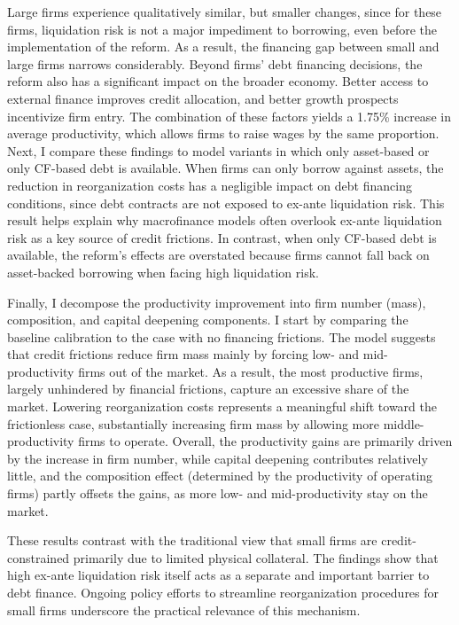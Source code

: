 \documentclass[12pt]{article}
\begin{document}
Large firms experience qualitatively similar, but smaller changes, since for these firms, liquidation risk is not a major impediment to borrowing, even before the implementation of the reform. As a result, the financing gap between small and large firms narrows considerably. Beyond firms' debt financing decisions, the reform also has a significant impact on the broader economy. Better access to external finance improves credit allocation, and better growth prospects incentivize firm entry. The combination of these factors yields a 1.75\% increase in average productivity, which allows firms to raise wages by the same proportion. Next, I compare these findings to model variants in which only asset-based or only CF-based debt is available. When firms can only borrow against assets, the reduction in reorganization costs has a negligible impact on debt financing conditions, since debt contracts are not exposed to ex-ante liquidation risk. This result helps explain why macrofinance models often overlook ex-ante liquidation risk as a key source of credit frictions. In contrast, when only CF-based debt is available, the reform's effects are overstated because firms cannot fall back on asset-backed borrowing when facing high liquidation risk.

Finally, I decompose the productivity improvement into firm number (mass), composition, and capital deepening components. I start by comparing the baseline calibration to the case with no financing frictions. The model suggests that credit frictions reduce firm mass mainly by forcing low- and mid-productivity firms out of the market. As a result, the most productive firms, largely unhindered by financial frictions, capture an excessive share of the market. Lowering reorganization costs represents a meaningful shift toward the frictionless case, substantially increasing firm mass by allowing more middle-productivity firms to operate. Overall, the productivity gains are primarily driven by the increase in firm number, while capital deepening contributes relatively little, and the composition effect (determined by the productivity of operating firms) partly offsets the gains, as more low- and mid-productivity stay on the market.

These results contrast with the traditional view that small firms are credit-constrained primarily due to limited physical collateral. The findings show that high ex-ante liquidation risk itself acts as a separate and important barrier to debt finance. Ongoing policy efforts to streamline reorganization procedures for small firms underscore the practical relevance of this mechanism.
\end{document}
